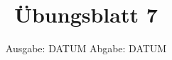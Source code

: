 

\title{Übungsblatt 7}
\date{%
  Ausgabe: DATUM %
  \hspace{3em}
  Abgabe: DATUM %
}



\maketitle
\thispagestyle{empty}
\tableofcontents
\newpage





